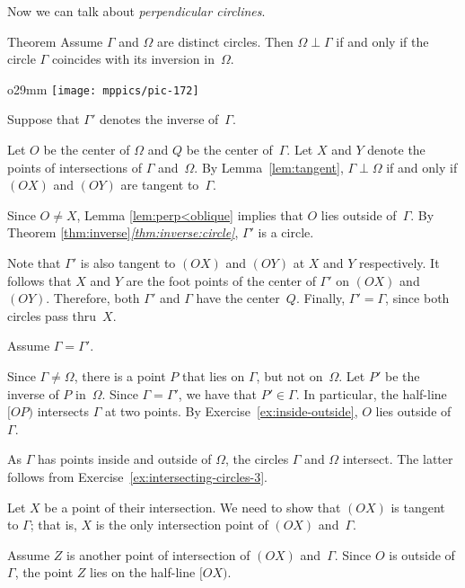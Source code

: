 Now we can talk about \emph{perpendicular circlines}.

\begin{thm}{Theorem}\label{thm:perp-inverse}
Assume $\Gamma$ and $\Omega$ are distinct circles. 
Then $\Omega\perp\Gamma$ if and only if the circle $\Gamma$ coincides with its inversion in~$\Omega$.
\end{thm}

\begin{wrapfigure}[7]{o}{29mm}
\vskip-4mm
\centering
\texttt{[image: mppics/pic-172]}
\end{wrapfigure}

Suppose that $\Gamma'$ denotes the inverse of~$\Gamma$.

Let $O$ be the center of $\Omega$
and $Q$ be the center of~$\Gamma$.
Let $X$ and $Y$ denote the points of intersections of  $\Gamma$ and~$\Omega$.
By Lemma~\ref{lem:tangent}, $\Gamma\perp\Omega$ if and only if $(OX)$ and $(OY)$ are tangent to~$\Gamma$.

Since $O\ne X$, Lemma \ref{lem:perp<oblique} implies that $O$ lies outside of~$\Gamma$.
By Theorem \ref{thm:inverse}\textit{\ref{thm:inverse:circle}}, $\Gamma'$ is a circle.

Note that $\Gamma'$ is also tangent to $(OX)$ and $(OY)$ at $X$ and $Y$ respectively. 
It follows that $X$ and $Y$ are the foot points of the center of $\Gamma'$ on $(OX)$ and $(OY)$.
Therefore, both $\Gamma'$ and $\Gamma$ have the center~$Q$.
Finally, $\Gamma'=\Gamma$, since both circles pass thru~$X$.

Assume $\Gamma=\Gamma'$.

Since $\Gamma\ne \Omega$, there is a point $P$ that lies on $\Gamma$, but not on~$\Omega$.
Let $P'$ be the inverse of $P$ in~$\Omega$.
Since $\Gamma=\Gamma'$, we have that $P'\in \Gamma$.
In particular, the half-line $[OP)$ intersects $\Gamma$ at two points.
By Exercise~\ref{ex:inside-outside}, 
 $O$ lies outside of~$\Gamma$.

As $\Gamma$ has points inside and outside of $\Omega$,
the circles $\Gamma$ and $\Omega$ intersect.
The latter follows from Exercise~\ref{ex:intersecting-circles-3}.

Let $X$ be a point of their intersection.
We need to show that $(OX)$ is tangent to $\Gamma$;
that is, $X$ is the only intersection point of $(OX)$ and~$\Gamma$.

Assume $Z$ is another point of intersection of $(OX)$ and~$\Gamma$.
Since $O$ is outside of $\Gamma$, 
the point $Z$ lies on the half-line $[OX)$.


